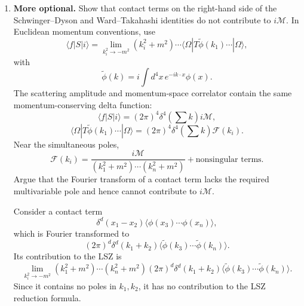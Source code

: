 \begin{enumerate}[label=\alph*)]
    \item \textbf{More optional.} Show that contact terms on the right-hand side
    of the Schwinger--Dyson and Ward--Takahashi identities do not contribute to
    $i\mathcal M$. In Euclidean momentum conventions, use
    \begin{equation}
        \langle f|S|i\rangle
        =\lim_{k_i^2\to-m^2}
        (k_i^2+m^2)\cdots
        \langle\Omega|T\widetilde\phi(k_1)\cdots|\Omega\rangle,
    \end{equation}
    with
    \begin{equation}
        \widetilde\phi(k)
        =i\int d^4x\,e^{-ik\cdot x}\phi(x).
    \end{equation}
    The scattering amplitude and momentum-space correlator contain the same
    momentum-conserving delta function:
    \begin{equation}
        \langle f|S|i\rangle
        =(2\pi)^4\delta^4\!\left(\sum k\right)i\mathcal M,
    \end{equation}
    \begin{equation}
        \langle\Omega|T\widetilde\phi(k_1)\cdots|\Omega\rangle
        =(2\pi)^4\delta^4\!\left(\sum k\right)\mathcal F(k_i).
    \end{equation}
    Near the simultaneous poles,
    \begin{equation}
        \mathcal F(k_i)
        =\frac{i\mathcal M}
        {(k_1^2+m^2)\cdots(k_n^2+m^2)}
        +\text{nonsingular terms}.
    \end{equation}
    Argue that the Fourier transform of a contact term lacks the required
    multivariable pole and hence cannot contribute to $i\mathcal M$.
    \begin{solution}
        Consider a contact term
        \begin{equation}
            \delta^d(x_1-x_2)\langle\phi(x_3) \cdots \phi(x_n)\rangle,
        \end{equation}
        which is Fourier transformed to
        \begin{equation}
            (2\pi)^d\delta^d(k_1 +k_2)\langle\tilde \phi(k_3) \cdots \tilde \phi(k_n)\rangle.
        \end{equation}
        Its contribution to the LSZ is
        \begin{equation}
            \lim_{k_i^2\to-m^2}(k_1^2+m^2)\cdots(k_n^2+m^2)(2\pi)^d\delta^d(k_1 +k_2)\langle\tilde \phi(k_3) \cdots \tilde \phi(k_n)\rangle.
        \end{equation}
        Since it contains no poles in $k_1,k_2$, it has no contribution to the LSZ reduction formula.
    \end{solution}


\end{enumerate}
